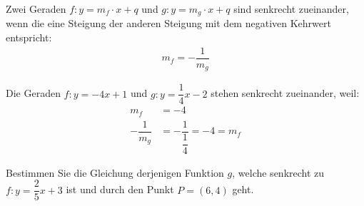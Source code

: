 \begin{fazit}[]{}
    Zwei Geraden $f:y=m_f\cdot x+q$ und $g:y=m_g\cdot x+q$ sind senkrecht zueinander, wenn die eine Steigung der anderen Steigung mit dem negativen Kehrwert entspricht:
    \begin{align*}
        m_f =-\dfrac{1}{m_g}
    \end{align*}
\end{fazit}
\begin{example}
    Die Geraden $f:y=-4x+1$ und $g:y=\dfrac{1}{4}x-2$ stehen senkrecht zueinander, weil:
    \begin{align*}
        m_f             & = -4                                  \\
        -\dfrac{1}{m_g} & = -\dfrac{1}{\dfrac{1}{4}} = -4 = m_f
    \end{align*}
\end{example}
\begin{example}
    Bestimmen Sie die Gleichung derjenigen Funktion $g$, welche senkrecht zu $f:y= \dfrac{2}{5} x +3$ ist und durch den Punkt $P=(6,4)$ geht.
\end{example}
\newpage

